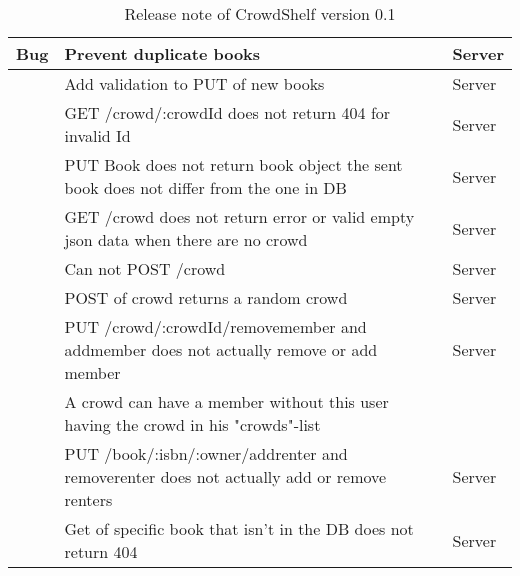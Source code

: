 \begin{table}[]
\centering
\begin{tabular}{|L{2cm}|L{10cm}|L{3cm}|}

\hline
Bug & Prevent duplicate books & Server \\
\hline
 & Add validation to PUT of new books & Server \\
 \hline
 & GET /crowd/:crowdId does not return 404 for invalid Id & Server \\
 \hline
 & PUT Book does not return book object the sent book does not differ from the one in DB & Server \\
 \hline
 & GET /crowd does not return error or valid empty json data when there are no crowd & Server \\
 \hline
 & Can not POST /crowd & Server \\
 \hline
 & POST of crowd returns a random crowd & Server \\
 \hline
 & PUT /crowd/:crowdId/removemember and addmember does not actually remove or add member & Server \\
 \hline
 & A crowd can have a member without this user having the crowd in his "crowds"-list &  \\
 \hline
 & PUT /book/:isbn/:owner/addrenter and removerenter does not actually add or remove renters & Server \\
 \hline
 & Get of specific book that isn't in the DB does not return 404 & Server \\
 \hline

\end{tabular}

\caption{Release note of CrowdShelf version 0.1}
\label{release-note-1}
\end{table}